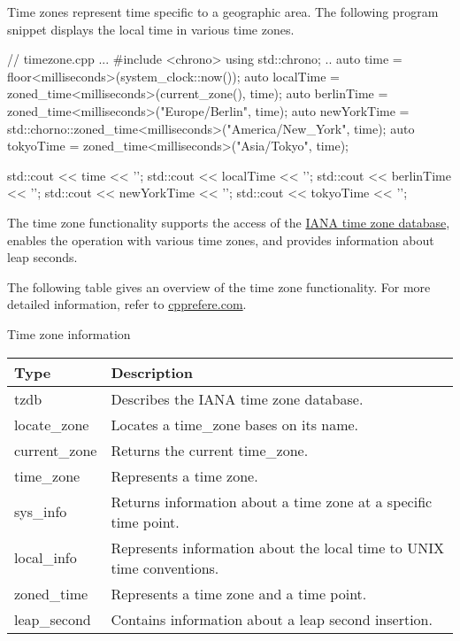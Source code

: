 
Time zones represent time specific to a geographic area. The following program snippet displays the local time in various time zones.


\begin{cpp}
// timezone.cpp
...
#include <chrono>
using std::chrono;
..
auto time = floor<milliseconds>(system_clock::now());
auto localTime = zoned_time<milliseconds>(current_zone(), time);
auto berlinTime = zoned_time<milliseconds>("Europe/Berlin", time);
auto newYorkTime = std::chorno::zoned_time<milliseconds>("America/New_York", time);
auto tokyoTime = zoned_time<milliseconds>("Asia/Tokyo", time);

std::cout << time << '\n';
std::cout << localTime << '\n';
std::cout << berlinTime << '\n';
std::cout << newYorkTime << '\n';
std::cout << tokyoTime << '\n';
\end{cpp}

The time zone functionality supports the access of the \href{https://www.iana.org/time-zones}{IANA time zone database}, enables the operation with various time zones, and provides information about leap seconds.

The following table gives an overview of the time zone functionality. For more detailed information, refer to \href{https://en.cppreference.com/w/cpp/chrono}{cpprefere.com}.

\begin{center}
Time zone information
\end{center}

\begin{longtable}[c]{|l|l|}
\hline
\textbf{Type} & \textbf{Description}                     \\ \hline
\endfirsthead
%
\endhead
%
tzdb          & Describes the IANA time zone database.   \\ \hline
locate\_zone  & Locates a time\_zone bases on its name.  \\ \hline
current\_zone & Returns the current time\_zone.          \\ \hline
time\_zone    & Represents a time zone.                  \\ \hline
sys\_info    & Returns information about a time zone at a specific time point.       \\ \hline
local\_info  & Represents information about the local time to UNIX time conventions. \\ \hline
zoned\_time   & Represents a time zone and a time point. \\ \hline
leap\_second & Contains information about a leap second insertion.                   \\ \hline
\end{longtable}

